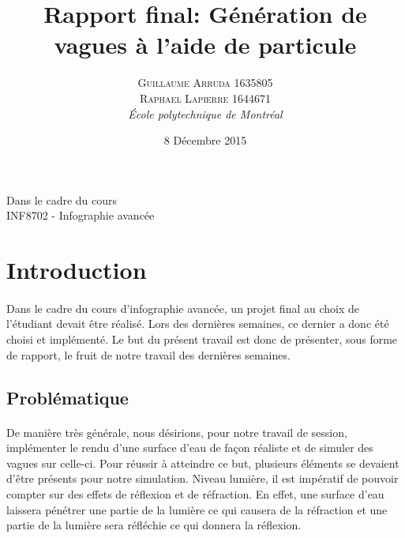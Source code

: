 \documentclass[a4paper, 12pt]{article} %
\title{Rapport final: Génération de vagues à l'aide de particule}
\author{\textsc{Guillaume Arruda 1635805\\Raphael Lapierre 1644671} %
\vspace{10pt}
\\{\textit{École polytechnique de Montréal}}} %
\date{8 Décembre 2015} %
\makeatletter
\renewcommand{\maketitle}{ %
\begin{center} %

\vspace*{25pt} %
{\LARGE\@title} %

\vspace{125pt} %

{\large\@author} %

\vspace{125pt} %
Dans le cadre du cours
\\INF8702 - Infographie avancée
\vspace{125pt} %
\\\@date %
\vspace{125pt} %

\end{center}
}
\makeatother
\begin{document}
\thispagestyle{empty}
\clearpage\maketitle %
\pagebreak[4]
\tableofcontents
\pagebreak[4]

\setlength{\headheight}{15.0pt}
\pagestyle{fancy}
\fancyhead[C]{}

\section{Introduction}
    \paragraph{}
    Dans le cadre du cours d'infographie avancée, un projet final au choix de l'étudiant 
    devait être réalisé. Lors des dernières semaines, ce dernier a donc été choisi et implémenté.
    Le but du présent travail est donc de présenter, sous forme de rapport, le fruit de notre
    travail des dernières semaines.

\subsection{Problématique}
    \paragraph{}
    De manière très générale, nous désirions, pour notre travail de session, implémenter 
    le rendu d'une surface d'eau de façon réaliste et de simuler des vagues sur celle-ci.
    Pour réussir à atteindre ce but, plusieurs éléments se devaient d'être présents pour notre
    simulation. Niveau lumière, il est impératif de pouvoir compter sur des effets de réflexion
    et de réfraction. En effet, une surface d'eau laissera pénétrer une partie de la lumière
    ce qui causera de la réfraction et une partie de la lumière sera réfléchie ce qui donnera
    la réflexion.
\end{document}
